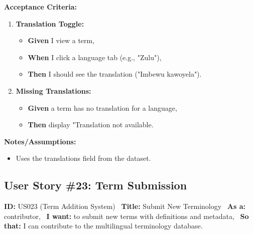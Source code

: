 \documentclass[12pt]{article}
\begin{document}
\vspace{1em}
\textbf{Acceptance Criteria:}
\begin{enumerate}
\item \textbf{Translation Toggle:}
\begin{itemize}
\item \textbf{Given} I view a term,
\item \textbf{When} I click a language tab (e.g., "Zulu"),
\item \textbf{Then} I should see the translation ("Imbewu kawoyela").
\end{itemize}

\item \textbf{Missing Translations:}
\begin{itemize}
    \item \textbf{Given} a term has no translation for a language,
    \item \textbf{Then} display "Translation not available.
\end{itemize}
\end{enumerate}

\vspace{1em}
\textbf{Notes/Assumptions:}
\begin{itemize}
\item Uses the translations field from the dataset.
\end{itemize}


\subsection{User Story \#23: Term Submission}
\textbf{ID:} US023 (Term Addition System) \
\textbf{Title:} Submit New Terminology \
\textbf{As a:} contributor, \
\textbf{I want:} to submit new terms with definitions and metadata, \
\textbf{So that:} I can contribute to the multilingual terminology database.
\end{document}
